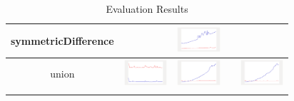 \begin{longtable}{ c|c c c c}
symmetricDifference
&
&
\includegraphics[width=1.6cm]{graphs/set/small/SymmetricDif}
&
&
\\\hline

union
&
\includegraphics[width=1.6cm]{graphs/sequence/small/Union}
&
\includegraphics[width=1.6cm]{graphs/set/small/Union}
&
&
\includegraphics[width=1.6cm]{graphs/orderedset/small/Union}
\\\hline

\caption{Evaluation Results }
\label{tab:resultsFull}
\end{longtable}


